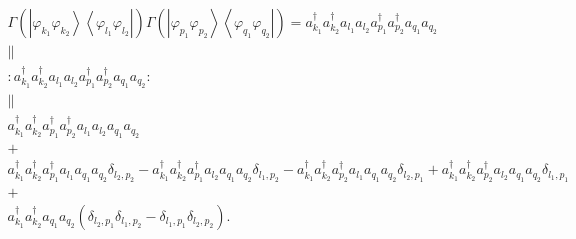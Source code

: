 \documentclass[aps,preprint]{revtex4}%
\begin{document}
\begin{gather*}
\Gamma\left(  \left\vert \varphi_{k_{1}}\varphi_{k_{2}}\right\rangle
\left\langle \varphi_{l_{1}}\varphi_{l_{2}}\right\vert \right)  \Gamma\left(
\left\vert \varphi_{p_{1}}\varphi_{p_{2}}\right\rangle \left\langle
\varphi_{q_{1}}\varphi_{q_{2}}\right\vert \right)  =a_{k_{1}}^{\dagger
}a_{k_{2}}^{\dagger}a_{l_{1}}a_{l_{2}}a_{p_{1}}^{\dagger}a_{p_{2}}^{\dagger
}a_{q_{1}}a_{q_{2}}\\
\parallel\\
:a_{k_{1}}^{\dagger}a_{k_{2}}^{\dagger}a_{l_{1}}a_{l_{2}}a_{p_{1}}^{\dagger
}a_{p_{2}}^{\dagger}a_{q_{1}}a_{q_{2}}:\\
\parallel\\
a_{k_{1}}^{\dagger}a_{k_{2}}^{\dagger}a_{p_{1}}^{\dagger}a_{p_{2}}^{\dagger
}a_{l_{1}}a_{l_{2}}a_{q_{1}}a_{q_{2}}\\
+\\
a_{k_{1}}^{\dagger}a_{k_{2}}^{\dagger}a_{p_{1}}^{\dagger}a_{l_{1}}a_{q_{1}%
}a_{q_{2}}\delta_{l_{2},p_{2}}-a_{k_{1}}^{\dagger}a_{k_{2}}^{\dagger}a_{p_{1}%
}^{\dagger}a_{l_{2}}a_{q_{1}}a_{q_{2}}\delta_{l_{1},p_{2}}-a_{k_{1}}^{\dagger
}a_{k_{2}}^{\dagger}a_{p_{2}}^{\dagger}a_{l_{1}}a_{q_{1}}a_{q_{2}}%
\delta_{l_{2},p_{1}}+a_{k_{1}}^{\dagger}a_{k_{2}}^{\dagger}a_{p_{2}}^{\dagger
}a_{l_{2}}a_{q_{1}}a_{q_{2}}\delta_{l_{1},p_{1}}\\
+\\
a_{k_{1}}^{\dagger}a_{k_{2}}^{\dagger}a_{q_{1}}a_{q_{2}}(\delta_{l_{2},p_{1}%
}\delta_{l_{1},p_{2}}-\delta_{l_{1},p_{1}}\delta_{l_{2},p_{2}}).
\end{gather*}%
\end{document}
